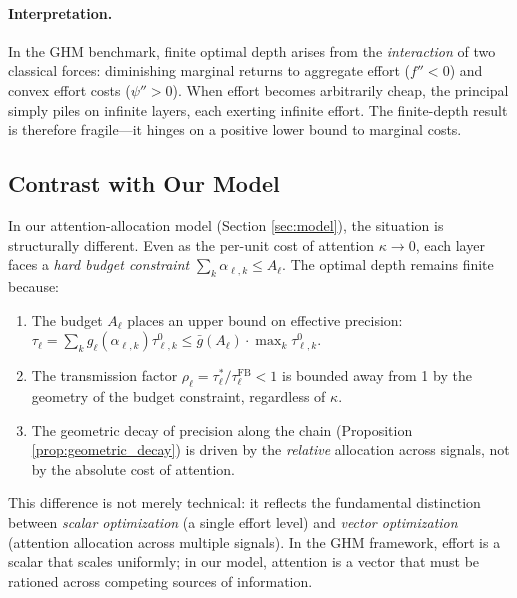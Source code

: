 \paragraph{Interpretation.} In the GHM benchmark, finite optimal depth arises from the 
\emph{interaction} of two classical forces: diminishing marginal returns to aggregate effort ($f'' < 0$) and convex effort costs ($\psi'' > 0$). When effort becomes arbitrarily cheap, the principal simply piles on infinite layers, each exerting infinite effort. The finite-depth result is therefore fragile---it hinges on a positive lower bound to marginal costs.

\subsection{Contrast with Our Model}

In our attention-allocation model (Section \ref{sec:model}), the situation is structurally different. Even as the per-unit cost of attention $\kappa \to 0$, each layer faces a \emph{hard budget constraint} $\sum_k \alpha_{\ell,k} \leq A_\ell$. The optimal depth remains finite because:
\begin{enumerate}[label=(\alph*)]
    \item The budget $A_\ell$ places an upper bound on effective precision: $\tau_\ell = \sum_k g_\ell(\alpha_{\ell,k}) \tau^0_{\ell,k} \leq \bar{g}(A_\ell) \cdot \max_k \tau^0_{\ell,k}$.
    \item The transmission factor $\rho_\ell = \tau^*_\ell / \tau^{\text{FB}}_\ell < 1$ is bounded away from 1 by the geometry of the budget constraint, regardless of $\kappa$.
    \item The geometric decay of precision along the chain (Proposition \ref{prop:geometric_decay}) is driven by the \emph{relative} allocation across signals, not by the absolute cost of attention.
\end{enumerate}

This difference is not merely technical: it reflects the fundamental distinction between \emph{scalar optimization} (a single effort level) and \emph{vector optimization} (attention allocation across multiple signals). In the GHM framework, effort is a scalar that scales uniformly; in our model, attention is a vector that must be rationed across competing sources of information.

